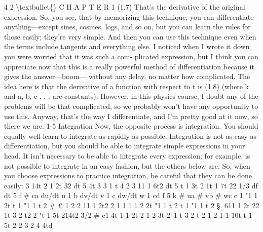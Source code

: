 \documentclass[10pt,oneside]{article}
\begin{document}
4 2 \textbackslash{}textbullet\{\} C H A P T E R  1 (1.7) That’s the derivative of the original expression. So, you see, that by memorizing this technique, you can differentiate anything---except sines, cosines, logs, and so on, but you can learn the rules for those easily; they’re very simple. And then you can use this technique even when the terms include tangents and everything else. I noticed when I wrote it down you were worried that it was such a com- plicated expression, but I think you can appreciate now that this is a really powerful method of differentiation because it gives the answer---boom--- without any delay, no matter how complicated. The idea here is that the derivative of a function with respect to t is (1.8) (where k and a, b, c . . . are constants). However, in this physics course, I doubt any of the problems will be that complicated, so we probably won’t have any opportunity to use this. Anyway, that’s the way I differentiate, and I’m pretty good at it now, so there we are. 1-5 Integration Now, the opposite process is integration. You should equally well learn to integrate as rapidly as possible. Integration is not as easy as differentiation, but you should be able to integrate simple expressions in your head. It isn’t necessary to be able to integrate every expression; for example, is not possible to integrate in an easy fashion, but the others below are. So, when you choose expressions to practice integration, be careful that they can be done easily: 3 14t 2 1 2t 32 dt 5 4t 3 3 1 t 4 2 3 11 1 6t2 dt 5 t 1 3t 2 1t 1 7t 22 1/3 df dt 5 f \# ca du/dt u 1 b dv/dt v 1 c dw/dt w 1 cd f 5 k \# ua \# vb \# wc c 1 "1 1 2t t 1 "1 1 t 2 \# £ 1 2 2 11 1 2t2 2 1 1 1 1 2 2t "1 1 t 2 t 1 "1 1 t 2 §. 611 1 2t 22 1t 3 2 t2 2 "t 1 5t 214t2 3/2 \# c1 4t 1 1 2t 2 1 2 3t 2–1 t 3 2 t 2 1 2 1 1 10t t 1 5t 2 2 3 2 4 4td\par
\end{document}
